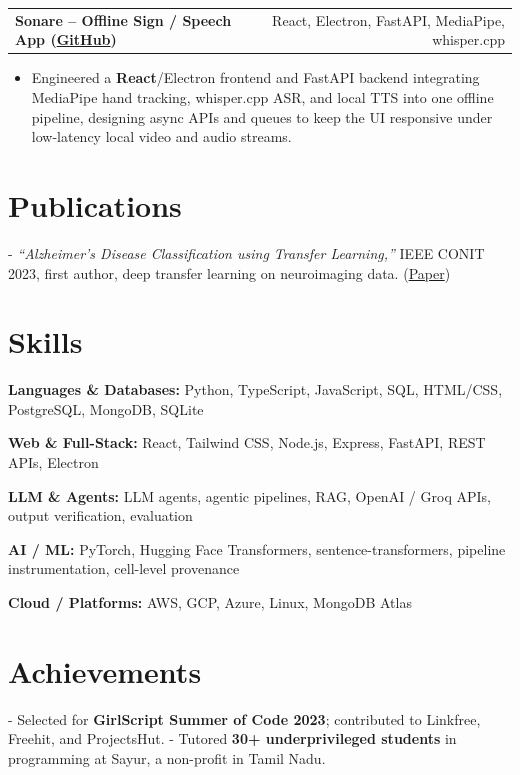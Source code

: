 \documentclass[letterpaper,11pt]{article}
\makeatletter
\newcommand{\projItem}[2]{%
  \vspace{4pt}
  \begin{tabular*}{\textwidth}{@{}l@{\extracolsep{\fill}}r@{}}
    \textbf{#1} & #2 \\
  \end{tabular*}\par\vspace{-2pt}
}
\newcommand{\skillLine}[2]{\textbf{#1:} #2\par\vspace{2pt}}
\newcommand{\inlineBlock}[1]{{\setlength{\leftskip}{0.18in}\small #1\par}}
\makeatother
\begin{document}
\projItem{Sonare -- Offline Sign / Speech App {\normalfont\small(\href{https://github.com/Deva-1903/Qualcomm-Sep25-Team-Sonare}{GitHub})}}{React, Electron, FastAPI, MediaPipe, whisper.cpp}
\begin{itemize}
  \item Engineered a \textbf{React}/Electron frontend and FastAPI backend integrating MediaPipe hand tracking, whisper.cpp ASR, and local TTS into one offline pipeline, designing async APIs and queues to keep the UI responsive under low-latency local video and audio streams.
\end{itemize}

\section{Publications}
\inlineBlock{- \textit{``Alzheimer's Disease Classification using Transfer Learning,''} IEEE CONIT 2023, first author, deep transfer learning on neuroimaging data. {\normalfont\small(\href{https://ieeexplore.ieee.org/document/10205760}{Paper})}}

\section{Skills}
\skillLine{Languages \& Databases}{Python, TypeScript, JavaScript, SQL, HTML/CSS, PostgreSQL, MongoDB, SQLite}
\skillLine{Web \& Full-Stack}{React, Tailwind CSS, Node.js, Express, FastAPI, REST APIs, Electron}
\skillLine{LLM \& Agents}{LLM agents, agentic pipelines, RAG, OpenAI / Groq APIs, output verification, evaluation}
\skillLine{AI / ML}{PyTorch, Hugging Face Transformers, sentence-transformers, pipeline instrumentation, cell-level provenance}
\skillLine{Cloud / Platforms}{AWS, GCP, Azure, Linux, MongoDB Atlas}

\section{Achievements}
\inlineBlock{- Selected for \textbf{GirlScript Summer of Code 2023}; contributed to Linkfree, Freehit, and ProjectsHut. - Tutored \textbf{30+ underprivileged students} in programming at Sayur, a non-profit in Tamil Nadu.}
\end{document}
